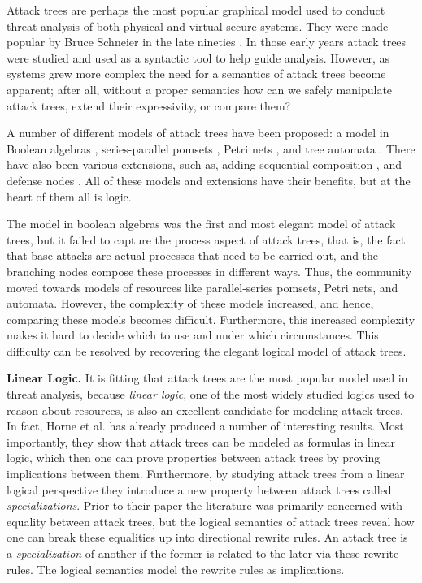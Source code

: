 Attack trees are perhaps the most popular graphical model used to
conduct threat analysis of both physical and virtual secure
systems. They were made popular by Bruce Schneier in the late nineties
\cite{Schneier:1999}.  In those early years attack trees were studied
and used as a syntactic tool to help guide analysis.  However, as
systems grew more complex the need for a semantics of attack trees
become apparent; after all, without a proper semantics how can we
safely manipulate attack trees, extend their expressivity, or compare
them?

A number of different models of attack trees have been proposed: a
model in Boolean algebras
\cite{Kordy:2014,Kordy:2012,Pietre-Cambacedes:2010}, series-parallel
pomsets \cite{Mauw:2006}, Petri nets \cite{McDermott:2001}, and tree
automata \cite{Camtepe:2007}.  There have also been various
extensions, such as, adding sequential composition \cite{Jhawar:2015},
and defense nodes \cite{Kordy:2011,Kordy:2012}.  All of these models
and extensions have their benefits, but at the heart of them all is
logic.

The model in boolean algebras was the first and most elegant model of
attack trees, but it failed to capture the process aspect of attack
trees, that is, the fact that base attacks are actual processes that
need to be carried out, and the branching nodes compose these
processes in different ways.  Thus, the community moved towards models
of resources like parallel-series pomsets, Petri nets, and automata.
However, the complexity of these models increased, and hence,
comparing these models becomes difficult. Furthermore, this increased
complexity makes it hard to decide which to use and under which
circumstances.  This difficulty can be resolved by recovering the
elegant logical model of attack trees.

\textbf{Linear Logic.}  It is fitting that attack trees are the most
popular model used in threat analysis, because \emph{linear logic},
one of the most widely studied logics used to reason about resources,
is also an excellent candidate for modeling attack trees.  In fact,
Horne et al.\cite{horne2017semantics} has already produced a number of
interesting results.  Most importantly, they show that attack trees
can be modeled as formulas in linear logic, which then one can prove
properties between attack trees by proving implications between them.
Furthermore, by studying attack trees from a linear logical
perspective they introduce a new property between attack trees called
\emph{specializations}.  Prior to their paper the literature was
primarily concerned with equality between attack trees, but the
logical semantics of attack trees reveal how one can break these
equalities up into directional rewrite rules.  An attack tree is a
\emph{specialization} of another if the former is related to the later
via these rewrite rules.  The logical semantics model the rewrite
rules as implications.

